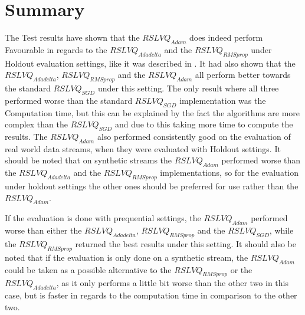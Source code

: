 \documentclass[12pt,oneside,a4paper,parskip]{scrbook}
\begin{document}
\chapter{Summary}
The Test results have shown that the $RSLVQ_\textit{Adam}$ does indeed perform Favourable in regards to the $RSLVQ_\textit{Adadelta}$ and the
$RSLVQ_\textit{RMSprop}$ under Holdout evaluation settings, like it was described in \cite{Kingma2014AdamAM}.
It had also shown that the $RSLVQ_\textit{Adadelta}$, $RSLVQ_\textit{RMSprop}$ and the $RSLVQ_\textit{Adam}$ all perform better
towards the standard $RSLVQ_\textit{SGD}$ under this setting.
The only result where all three performed worse than the standard $RSLVQ_\textit{SGD}$ implementation was the Computation time,
but this can be explained by the fact the algorithms are more complex than the $RSLVQ_\textit{SGD}$ and due to this taking more time
to compute the results.
The $RSLVQ_\textit{Adam}$ also performed consistently good on the evaluation of real world data streams, when they were evaluated with 
Holdout settings.
It should be noted that on synthetic streams the $RSLVQ_\textit{Adam}$ performed worse than the $RSLVQ_\textit{Adadelta}$ and the $RSLVQ_\textit{RMSprop}$
implementations, so for the evaluation under holdout settings the other ones should be preferred for use rather than the $RSLVQ_\textit{Adam}$.

If the evaluation is done with prequential settings, the $RSLVQ_\textit{Adam}$ performed worse than either the
$RSLVQ_\textit{Adadelta}$, $RSLVQ_\textit{RMSprop}$ and the $RSLVQ_\textit{SGD}$, while the $RSLVQ_\textit{RMSprop}$ 
returned the best results under this setting.
It should also be noted that if the evaluation is only done on a synthetic stream, the $RSLVQ_\textit{Adam}$ could be taken as a 
possible alternative to the $RSLVQ_\textit{RMSprop}$ or the $RSLVQ_\textit{Adadelta}$, as it only performs a little bit worse than the other two in this case,
but is faster in regards to the computation time in comparison to the other two.

\backmatter

\printacronyms[include-classes=abbrev,name=Abbreviations]


\listoffigures
{}			

\listoftables
\end{document}
